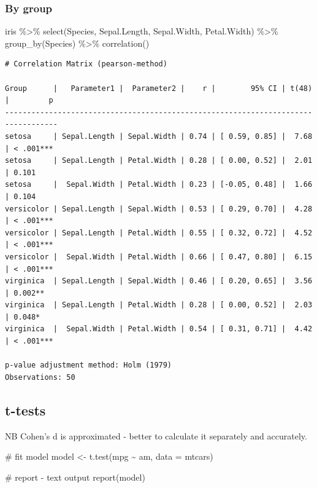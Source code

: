 \documentclass[
  letterpaper,
  DIV=11,
  numbers=noendperiod]{scrreprt}
\newenvironment{Shaded}{\begin{snugshade}}{\end{snugshade}}
\newcommand{\AttributeTok}[1]{\textcolor[rgb]{0.40,0.45,0.13}{#1}}
\newcommand{\CommentTok}[1]{\textcolor[rgb]{0.37,0.37,0.37}{#1}}
\newcommand{\FunctionTok}[1]{\textcolor[rgb]{0.28,0.35,0.67}{#1}}
\newcommand{\NormalTok}[1]{\textcolor[rgb]{0.00,0.23,0.31}{#1}}
\newcommand{\OtherTok}[1]{\textcolor[rgb]{0.00,0.23,0.31}{#1}}
\newcommand{\SpecialCharTok}[1]{\textcolor[rgb]{0.37,0.37,0.37}{#1}}
\begin{document}
\subsubsection{By group}\label{by-group}

\begin{Shaded}
\begin{Highlighting}[]
\NormalTok{iris }\SpecialCharTok{\%\textgreater{}\%}
  \FunctionTok{select}\NormalTok{(Species, Sepal.Length, Sepal.Width, Petal.Width) }\SpecialCharTok{\%\textgreater{}\%}
  \FunctionTok{group\_by}\NormalTok{(Species) }\SpecialCharTok{\%\textgreater{}\%}
  \FunctionTok{correlation}\NormalTok{()}
\end{Highlighting}
\end{Shaded}

\begin{verbatim}
# Correlation Matrix (pearson-method)

Group      |   Parameter1 |  Parameter2 |    r |        95% CI | t(48) |         p
----------------------------------------------------------------------------------
setosa     | Sepal.Length | Sepal.Width | 0.74 | [ 0.59, 0.85] |  7.68 | < .001***
setosa     | Sepal.Length | Petal.Width | 0.28 | [ 0.00, 0.52] |  2.01 | 0.101    
setosa     |  Sepal.Width | Petal.Width | 0.23 | [-0.05, 0.48] |  1.66 | 0.104    
versicolor | Sepal.Length | Sepal.Width | 0.53 | [ 0.29, 0.70] |  4.28 | < .001***
versicolor | Sepal.Length | Petal.Width | 0.55 | [ 0.32, 0.72] |  4.52 | < .001***
versicolor |  Sepal.Width | Petal.Width | 0.66 | [ 0.47, 0.80] |  6.15 | < .001***
virginica  | Sepal.Length | Sepal.Width | 0.46 | [ 0.20, 0.65] |  3.56 | 0.002**  
virginica  | Sepal.Length | Petal.Width | 0.28 | [ 0.00, 0.52] |  2.03 | 0.048*   
virginica  |  Sepal.Width | Petal.Width | 0.54 | [ 0.31, 0.71] |  4.42 | < .001***

p-value adjustment method: Holm (1979)
Observations: 50
\end{verbatim}

\subsection{t-tests}\label{t-tests}

NB Cohen's d is approximated - better to calculate it separately and
accurately.

\begin{Shaded}
\begin{Highlighting}[]
\CommentTok{\# fit model}
\NormalTok{model }\OtherTok{\textless{}{-}} \FunctionTok{t.test}\NormalTok{(mpg }\SpecialCharTok{\textasciitilde{}}\NormalTok{ am, }\AttributeTok{data =}\NormalTok{ mtcars)}

\CommentTok{\# report {-} text output }
\FunctionTok{report}\NormalTok{(model)}
\end{Highlighting}
\end{Shaded}
\end{document}
